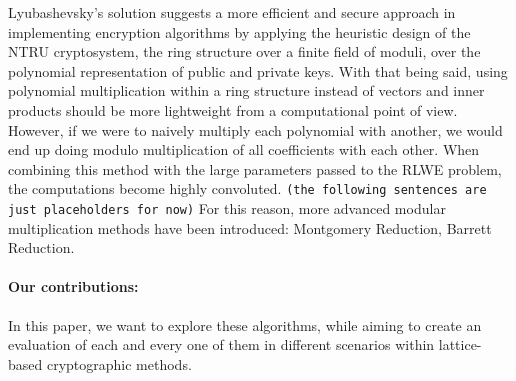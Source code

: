 \documentclass[11pt,
  titlepage=false,
  abstract=on,
]{scrreprt}
\begin{document}
Lyubashevsky's solution suggests a more efficient and secure approach in implementing encryption algorithms by applying the heuristic design of the NTRU cryptosystem, the ring structure over a finite field of moduli, over the polynomial representation 
of public and private keys. With that being said, using polynomial multiplication within a ring structure instead of vectors and inner products should be more lightweight from a computational point of view.
However, if we were to naively multiply each polynomial with another, we would end up doing modulo multiplication of all coefficients with each other. When combining this method with the large parameters passed to the RLWE
problem, the computations become highly convoluted. \texttt{(the following sentences are just placeholders for now)} For this reason, more advanced modular multiplication methods have been introduced: Montgomery Reduction, Barrett Reduction. 
\paragraph{Our contributions: }In this paper, we want to explore these algorithms, while aiming to create an evaluation of each and every one of them in different scenarios within lattice-based cryptographic methods.

\end{document}
